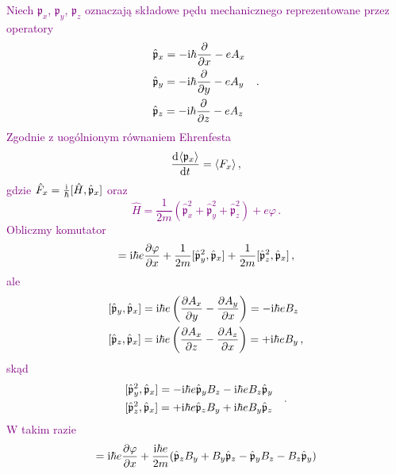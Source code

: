 \documentclass{myclass}
\begin{document}
\textcolor{purple}{Niech \(\mathfrak{p}_x\), \(\mathfrak{p}_y\), \(\mathfrak{p}_z\) oznaczają
składowe pędu mechanicznego reprezentowane przez operatory
\begin{equation*}
\begin{split}
&\hat{\mathfrak{p}}_x=-\mathrm{i}\hbar\pdv{ }{x}-eA_x\\
&\hat{\mathfrak{p}}_y=-\mathrm{i}\hbar\pdv{ }{y}-eA_y\\
&\hat{\mathfrak{p}}_z=-\mathrm{i}\hbar\pdv{ }{z}-eA_z
\end{split}\quad.
\end{equation*}
Zgodnie z uogólnionym równaniem Ehrenfesta
\begin{equation*}
\dv[]{\langle\mathfrak{p}_x\rangle}{t}=\langle F_x\rangle\,,
\end{equation*}
gdzie \(\hat{F}_x=\frac{\mathrm{i}}{\hbar}[\hat{H},\hat{\mathfrak{p}}_x]\) oraz
\begin{equation*}
\hat{H}=\frac{1}{2m}(\hat{\mathfrak{p}}_x^2+\hat{\mathfrak{p}}_y^2+\hat{\mathfrak{p}}_z^2)+e\varphi\,.
\end{equation*}
Obliczmy komutator
\begin{equation*}
[\hat{H},\hat{\mathfrak{p}}_x]=\im\hbar e\pdv{\varphi}{x}+\frac{1}{2m}[\hat{\mathfrak{p}}_y^2,\hat{\mathfrak{p}}_x]+\frac{1}{2m}[\hat{\mathfrak{p}}_z^2,\hat{\mathfrak{p}}_x]\,,
\end{equation*}
ale
\begin{equation*}
\begin{split}
    &[\hat{\mathfrak{p}}_y,\hat{\mathfrak{p}}_x]=\mathrm{i}\hbar e\left(\pdv{A_x}{y}-\pdv{A_y}{x}\right)=-\mathrm{i}\hbar eB_z\\
    &[\hat{\mathfrak{p}}_z,\hat{\mathfrak{p}}_x]=\mathrm{i}\hbar e\left(\pdv{A_x}{z}-\pdv{A_z}{x}\right)=+\mathrm{i}\hbar eB_y\,,
\end{split}
\end{equation*}
skąd
\begin{equation*}
\begin{split}
&[\hat{\mathfrak{p}}_y^2,\hat{\mathfrak{p}}_x]=-\mathrm{i}\hbar e\hat{\mathfrak{p}}_yB_z-\mathrm{i}\hbar eB_z\hat{\mathfrak{p}}_y\\
&[\hat{\mathfrak{p}}_z^2,\hat{\mathfrak{p}}_x]=+\mathrm{i}\hbar e\hat{\mathfrak{p}}_zB_y+\mathrm{i}\hbar eB_y\hat{\mathfrak{p}}_z
\end{split}\quad.
\end{equation*}
W takim razie
\begin{equation*}
[\hat{H},\hat{\mathfrak{p}}_x]=\im\hbar e\pdv{\varphi}{x}+\frac{\im\hbar e}{2m}(\hat{\mathfrak{p}}_zB_y+B_y\hat{\mathfrak{p}}_z-\hat{\mathfrak{p}}_yB_z-B_z\hat{\mathfrak{p}}_y)

\end{equation*}}
\end{document}
